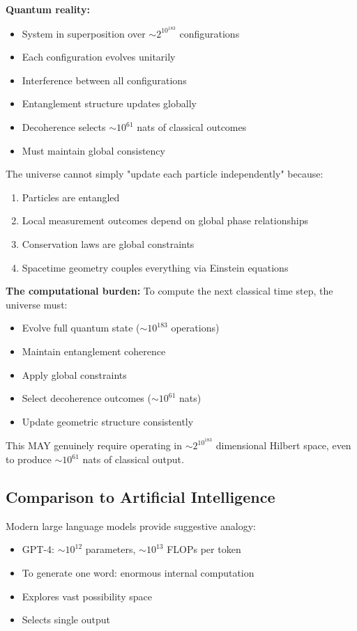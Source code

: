 ﻿\documentclass{article}
\begin{document}
\textbf{Quantum reality:}
\begin{itemize}
\item System in superposition over $\sim 2^{10^{183}}$ configurations
\item Each configuration evolves unitarily
\item Interference between all configurations
\item Entanglement structure updates globally
\item Decoherence selects $\sim 10^{61}$ nats of classical outcomes
\item Must maintain global consistency
\end{itemize}


The universe cannot simply "update each particle independently" because:
\begin{enumerate}
\item Particles are entangled
\item Local measurement outcomes depend on global phase relationships  
\item Conservation laws are global constraints
\item Spacetime geometry couples everything via Einstein equations
\end{enumerate}


\textbf{The computational burden:}
To compute the next classical time step, the universe must:
\begin{itemize}
\item Evolve full quantum state ($\sim 10^{183}$ operations)
\item Maintain entanglement coherence
\item Apply global constraints
\item Select decoherence outcomes ($\sim 10^{61}$ nats)
\item Update geometric structure consistently
\end{itemize}


This MAY genuinely require operating in $\sim 2^{10^{183}}$ dimensional Hilbert space, even to produce $\sim 10^{61}$ nats of classical output.


\subsection{Comparison to Artificial Intelligence}


Modern large language models provide suggestive analogy:
\begin{itemize}
\item GPT-4: $\sim 10^{12}$ parameters, $\sim 10^{13}$ FLOPs per token
\item To generate one word: enormous internal computation
\item Explores vast possibility space
\item Selects single output
\end{itemize}
\end{document}
